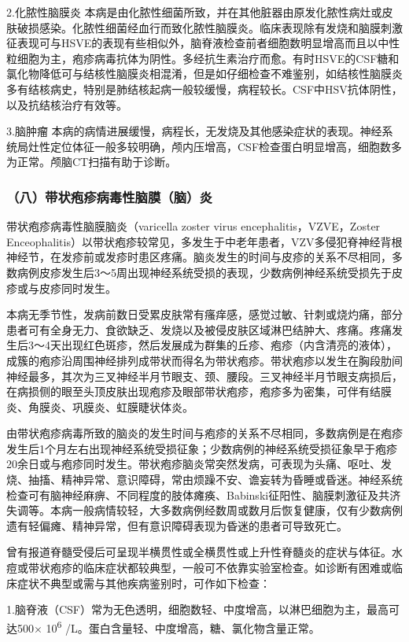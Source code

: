 2.化脓性脑膜炎
本病是由化脓性细菌所致，并在其他脏器由原发化脓性病灶或皮肤破损感染。化脓性细菌经血行而致化脓性脑膜炎。临床表现除有发烧和脑膜刺激征表现可与HSVE的表现有些相似外，脑脊液检查前者细胞数明显增高而且以中性粒细胞为主，疱疹病毒抗体为阴性。多经抗生素治疗而愈。有时HSVE的CSF糖和氯化物降低可与结核性脑膜炎相混淆，但是如仔细检查不难鉴别，如结核性脑膜炎多有结核病史，特别是肺结核起病一般较缓慢，病程较长。CSF中HSV抗体阴性，以及抗结核治疗有效等。

3.脑肿瘤
本病的病情进展缓慢，病程长，无发烧及其他感染症状的表现。神经系统局灶性定位体征一般多较明确，颅内压增高，CSF检查蛋白明显增高，细胞数多为正常。颅脑CT扫描有助于诊断。

\subsubsection{（八）带状疱疹病毒性脑膜（脑）炎}

带状疱疹病毒性脑膜脑炎（varicella zoster virus
encephalitis，VZVE，Zoster
Enceophalitis）以带状疱疹较常见，多发生于中老年患者，VZV多侵犯脊神经背根神经节，在发疹前或发疹时患区疼痛。脑炎发生的时间与皮疹的关系不尽相同，多数病例皮疹发生后3～5周出现神经系统受损的表现，少数病例神经系统受损先于皮疹或与皮疹同时发生。

本病无季节性，发病前数日受累皮肤常有瘙痒感，感觉过敏、针刺或烧灼痛，部分患者可有全身无力、食欲缺乏、发烧以及被侵皮肤区域淋巴结肿大、疼痛。疼痛发生后3～4天出现红色斑疹，然后发展成为群集的丘疹、疱疹（内含清亮的液体），成簇的疱疹沿周围神经排列成带状而得名为带状疱疹。带状疱疹以发生在胸段肋间神经最多，其次为三叉神经半月节眼支、颈、腰段。三叉神经半月节眼支病损后，在病损侧的眼至头顶皮肤出现疱疹及眼部带状疱疹，疱疹多为密集，可伴有结膜炎、角膜炎、巩膜炎、虹膜睫状体炎。

由带状疱疹病毒所致的脑炎的发生时间与疱疹的关系不尽相同，多数病例是在疱疹发生后1个月左右出现神经系统受损征象；少数病例的神经系统受损征象早于疱疹20余日或与疱疹同时发生。带状疱疹脑炎常突然发病，可表现为头痛、呕吐、发烧、抽搐、精神异常、意识障碍，常由烦躁不安、谵妄转为昏睡或昏迷。神经系统检查可有脑神经麻痹、不同程度的肢体瘫痪、Babinski征阳性、脑膜刺激征及共济失调等。本病一般病情较轻，大多数病例经数周或数月后恢复健康，仅有少数病例遗有轻偏瘫、精神异常，但有意识障碍表现为昏迷的患者可导致死亡。

曾有报道脊髓受侵后可呈现半横贯性或全横贯性或上升性脊髓炎的症状与体征。水痘或带状疱疹的临床症状都较典型，一般可不依靠实验室检查。如诊断有困难或临床症状不典型或需与其他疾病鉴别时，可作如下检查：

1.脑脊液（CSF）常为无色透明，细胞数轻、中度增高，以淋巴细胞为主，最高可达500×
10\textsuperscript{6} /L。蛋白含量轻、中度增高，糖、氯化物含量正常。

